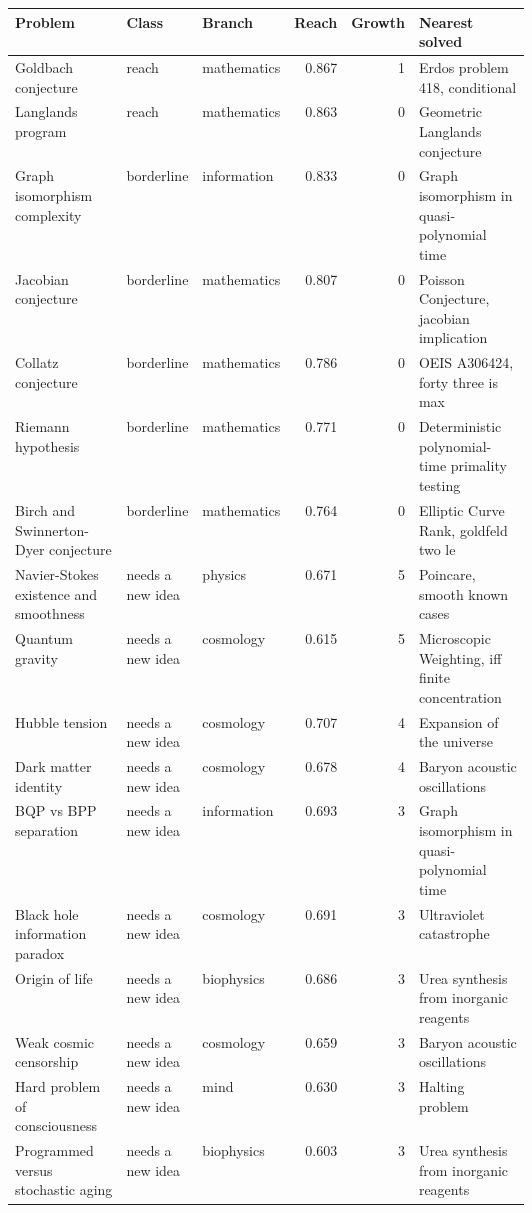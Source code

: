 \begin{longtable}{@{}p{0.3\linewidth}llrrp{0.3\linewidth}@{}}
\toprule Problem & Class & Branch & Reach & Growth & Nearest solved \\ \midrule \endhead
\bottomrule \endfoot
Goldbach conjecture & reach & mathematics & 0.867 & 1 & Erdos problem 418, conditional \\
Langlands program & reach & mathematics & 0.863 & 0 & Geometric Langlands conjecture \\
Graph isomorphism complexity & borderline & information & 0.833 & 0 & Graph isomorphism in quasi-polynomial time \\
Jacobian conjecture & borderline & mathematics & 0.807 & 0 & Poisson Conjecture, jacobian implication \\
Collatz conjecture & borderline & mathematics & 0.786 & 0 & OEIS A306424, forty three is max \\
Riemann hypothesis & borderline & mathematics & 0.771 & 0 & Deterministic polynomial-time primality testing \\
Birch and Swinnerton-Dyer conjecture & borderline & mathematics & 0.764 & 0 & Elliptic Curve Rank, goldfeld two le \\
Navier-Stokes existence and smoothness & needs a new idea & physics & 0.671 & 5 & Poincare, smooth known cases \\
Quantum gravity & needs a new idea & cosmology & 0.615 & 5 & Microscopic Weighting, iff finite concentration \\
Hubble tension & needs a new idea & cosmology & 0.707 & 4 & Expansion of the universe \\
Dark matter identity & needs a new idea & cosmology & 0.678 & 4 & Baryon acoustic oscillations \\
BQP vs BPP separation & needs a new idea & information & 0.693 & 3 & Graph isomorphism in quasi-polynomial time \\
Black hole information paradox & needs a new idea & cosmology & 0.691 & 3 & Ultraviolet catastrophe \\
Origin of life & needs a new idea & biophysics & 0.686 & 3 & Urea synthesis from inorganic reagents \\
Weak cosmic censorship & needs a new idea & cosmology & 0.659 & 3 & Baryon acoustic oscillations \\
Hard problem of consciousness & needs a new idea & mind & 0.630 & 3 & Halting problem \\
Programmed versus stochastic aging & needs a new idea & biophysics & 0.603 & 3 & Urea synthesis from inorganic reagents \\

\end{longtable}
